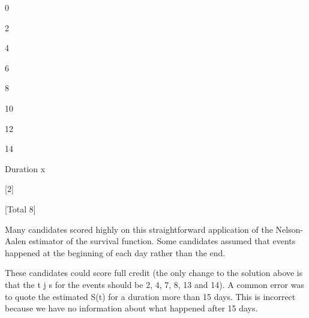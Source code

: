 \documentclass[a4paper,12pt]{article}
\begin{document}
0

2

4

6

8

10

12

14

Duration x

[2]

[Total 8]

Many candidates scored highly on this straightforward application of the Nelson-Aalen estimator of the survival function. Some candidates assumed that events happened at the beginning of each day rather than the end.

These candidates could score full credit (the only change to the solution above is that the t j s for the events should be 2, 4, 7, 8, 13 and 14). A common error was to quote the estimated S(t) for a duration more than 15 days. This is incorrect because we have no information about what happened after 15 days.

\end{document}

